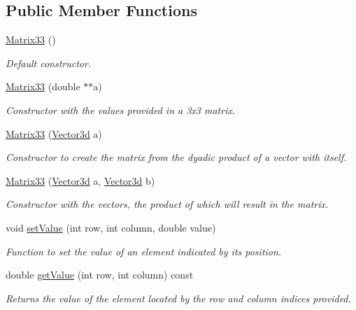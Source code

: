 \subsection*{\-Public \-Member \-Functions}
\begin{DoxyCompactItemize}
\item 
\hyperlink{classMatrix33_a70acb6647b172d017cc4265a29a7d263}{\-Matrix33} ()
\begin{DoxyCompactList}\small\item\em \-Default constructor. \end{DoxyCompactList}\item 
\hyperlink{classMatrix33_a4399c6da8f1ac31ce514550282c823cf}{\-Matrix33} (double $\ast$$\ast$a)
\begin{DoxyCompactList}\small\item\em \-Constructor with the values provided in a 3x3 matrix. \end{DoxyCompactList}\item 
\hyperlink{classMatrix33_a1f070a29a710043c38b56cee8214e6f7}{\-Matrix33} (\hyperlink{classVector3d}{\-Vector3d} a)
\begin{DoxyCompactList}\small\item\em \-Constructor to create the matrix from the dyadic product of a vector with itself. \end{DoxyCompactList}\item 
\hyperlink{classMatrix33_a7f1deae895c26e47c39c76bfaa31d3d2}{\-Matrix33} (\hyperlink{classVector3d}{\-Vector3d} a, \hyperlink{classVector3d}{\-Vector3d} b)
\begin{DoxyCompactList}\small\item\em \-Constructor with the vectors, the product of which will result in the matrix. \end{DoxyCompactList}\item 
void \hyperlink{classMatrix33_a6cdcec77fd089b2e73ad7ae85ecff30b}{set\-Value} (int row, int column, double value)
\begin{DoxyCompactList}\small\item\em \-Function to set the value of an element indicated by its position. \end{DoxyCompactList}\item 
double \hyperlink{classMatrix33_ab53b3e37ad830a87a804cf26311ba088}{get\-Value} (int row, int column) const 
\begin{DoxyCompactList}\small\item\em \-Returns the value of the element located by the row and column indices provided. \end{DoxyCompactList}\item 
$$
\end{DoxyCompactItemize}

